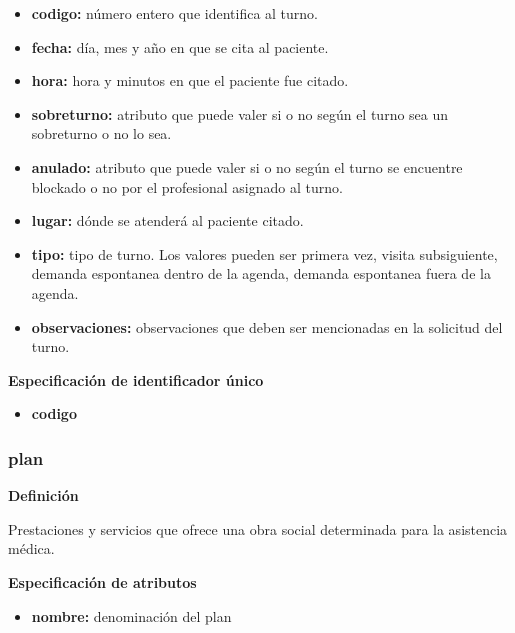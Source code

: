 \documentclass[a4paper,11pt]{article}
\begin{document}
\begin{itemize}

     \item \textbf{codigo:} número entero que identifica al turno.

     \item \textbf{fecha:} día, mes y año en que se cita al paciente.

     \item \textbf{hora:} hora y minutos en que el paciente fue citado.

     \item \textbf{sobreturno:} atributo que puede valer si o no según el turno sea un sobreturno 
     o no lo sea.

     \item \textbf{anulado:} atributo que puede valer si o no según el turno se encuentre blockado 
     o no por el profesional asignado al turno.

     \item \textbf{lugar:} dónde se atenderá al paciente citado.

     \item \textbf{tipo:} tipo de turno. Los valores pueden ser primera vez, visita subsiguiente, 
     demanda espontanea dentro de la agenda, demanda espontanea fuera de la agenda.

     \item \textbf{observaciones:} observaciones que deben ser mencionadas en la solicitud del turno.

\end{itemize}

\textbf{Especificación de identificador único}

\begin{itemize}

     \item \textbf{codigo}

\end{itemize}

\subsubsection{\textbf{plan}}

\textbf{Definición}

Prestaciones y servicios que ofrece una obra social determinada para la asistencia médica.

\textbf{Especificación de atributos}

\begin{itemize}

     \item \textbf{nombre:} denominación del plan

\end{itemize}
\end{document}
